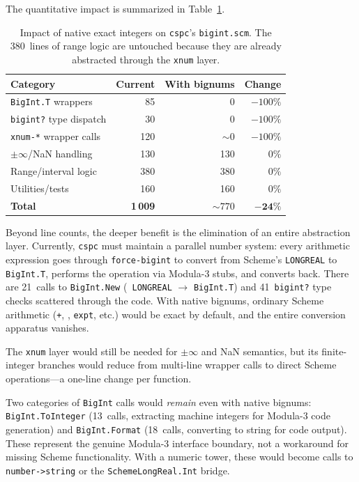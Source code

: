 \documentclass[12pt]{report}
\begin{document}
\noindent The quantitative impact is summarized in
Table~\ref{tab:cspc-impact}.

\begin{table}[htbp]
\centering
\begin{tabular}{lrrr}
\toprule
\textbf{Category} & \textbf{Current} & \textbf{With bignums} & \textbf{Change} \\
\midrule
{\tt BigInt.T} wrappers         &  85 &   0 & $-100\%$ \\
{\tt bigint?} type dispatch     &  30 &   0 & $-100\%$ \\
{\tt xnum-*} wrapper calls      & 120 &  $\sim\!0$ & $-100\%$ \\
$\pm\infty$/NaN handling        & 130 & 130 & $0\%$ \\
Range/interval logic            & 380 & 380 & $0\%$ \\
Utilities/tests                 & 160 & 160 & $0\%$ \\
\midrule
\textbf{Total}                  & \textbf{1\,009} & \textbf{$\sim\!770$} & $\mathbf{-24\%}$ \\
\bottomrule
\end{tabular}
\caption{Impact of native exact integers on {\tt cspc}'s
  {\tt bigint.scm}.  The 380~lines of range logic are untouched
  because they are already abstracted through the {\tt xnum} layer.}
\label{tab:cspc-impact}
\end{table}

Beyond line counts, the deeper benefit is the elimination of an
entire abstraction layer.  Currently, {\tt cspc} must maintain a
parallel number system: every arithmetic expression goes through
{\tt force-bigint} to convert from Scheme's {\tt LONGREAL} to
{\tt BigInt.T}, performs the operation via Modula-3 stubs, and
converts back.  There are 21~calls to {\tt BigInt.New} ({\tt
LONGREAL} $\to$ {\tt BigInt.T}) and 41~{\tt bigint?} type checks
scattered through the code.  With native bignums, ordinary Scheme
arithmetic ({\tt +}, {\tt *}, {\tt expt}, etc.) would be exact by
default, and the entire conversion apparatus vanishes.

The {\tt xnum} layer would still be needed for $\pm\infty$ and
NaN semantics, but its finite-integer branches would reduce from
multi-line wrapper calls to direct Scheme operations---a one-line
change per function.

Two categories of {\tt BigInt} calls would \emph{remain} even with
native bignums: {\tt BigInt.ToInteger} (13~calls, extracting machine
integers for Modula-3 code generation) and {\tt BigInt.Format}
(18~calls, converting to string for code output).  These represent
the genuine Modula-3 interface boundary, not a workaround for
missing Scheme functionality.  With a numeric tower, these would
become calls to {\tt number->string} or the {\tt SchemeLongReal.Int}
bridge.
\end{document}
